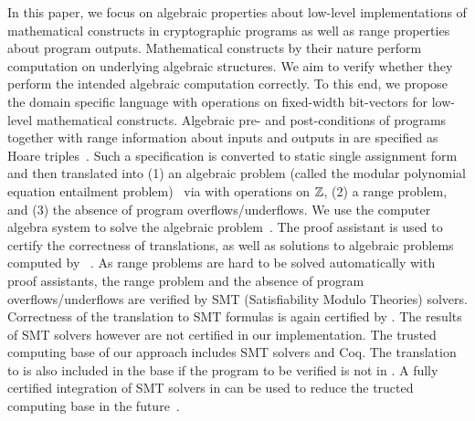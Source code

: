 In this paper, we focus on algebraic properties about low-level
implementations of mathematical constructs in cryptographic programs
as well as range properties about program outputs.
Mathematical constructs by their nature perform computation on
underlying algebraic structures. We aim to verify whether they perform
the intended algebraic computation correctly. To this end, we propose the
domain specific language \bvdsl with operations on fixed-width bit-vectors for low-level
mathematical constructs. Algebraic pre- and post-conditions of
programs together with range information about inputs and outputs in \bvdsl are specified as Hoare
triples~\cite{H:69:ABCP}.
Such a specification is converted to static single
assignment form and then translated into (1) an algebraic problem (called
the modular polynomial equation entailment
problem)~\cite{AWZ:88:DQVP,H:07:AENTP} via \zdsl with operations on $\mathbb{Z}$, (2) a range problem, and (3) the absence of program overflows/underflows. We use the computer
algebra system \singular to solve the algebraic problem~\cite{GP:08:SICA}.
The proof assistant \coq is used to certify the
correctness of translations, as well as solutions to algebraic
problems computed by \singular~\cite{YC:2004:ITPPDC}.
As range problems are hard to be solved automatically with proof assistants, the range problem and the absence of program overflows/underflows are verified by SMT (Satisfiability Modulo Theories) solvers.
Correctness of the translation to SMT formulas is again certified by
\coq. The results of SMT solvers however are not certified in our
implementation.
The trusted computing base of our approach includes SMT solvers and Coq.
The translation to \bvdsl is also included in the base if the program to be verified is not in \bvdsl.
A fully certified integration of SMT solvers in \coq
can be used to reduce the tructed computing base in the future~\cite{EMT+:17:SPISS}.


